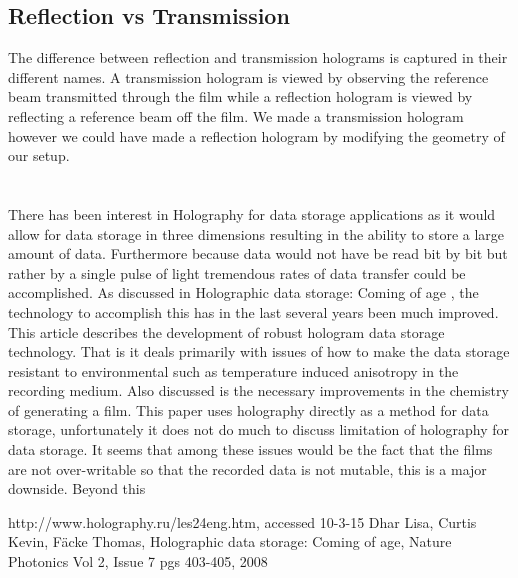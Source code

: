 \documentclass[11pt,letterpaper]{article}
\begin{document}
\subsection{Reflection vs Transmission}
The difference between reflection and transmission holograms is captured in their different names. A transmission hologram is viewed by observing the reference beam transmitted through the film while a reflection hologram is viewed by reflecting a reference beam off the film. We made a transmission hologram however we could have made a reflection hologram by modifying the geometry of our setup.
\section{} %
There has been interest in Holography for data storage applications as it would allow for data storage in three dimensions resulting in the ability to store a large amount of data. Furthermore because data would not have be read bit by bit but rather by a single pulse of light tremendous rates of data transfer could be accomplished. As discussed in Holographic data storage: Coming of age \cite{Data_Storage}, the technology to accomplish this has in the last several years been much improved. This article describes the development of robust hologram data storage technology. That is it deals primarily with issues of how to make the data storage resistant to environmental such as temperature induced anisotropy in the recording medium. Also discussed is the necessary improvements in the chemistry of generating a film. This paper uses holography directly as a method for data storage, unfortunately it does not do much to discuss limitation of holography for data storage. It seems that among these issues would be the fact that the films are not over-writable so that the recorded data is not mutable, this is a major downside. Beyond this 

\begin{thebibliography}{99}
 http://www.holography.ru/les24eng.htm, accessed 10-3-15
 Dhar Lisa, Curtis Kevin,  Fäcke Thomas, Holographic data storage: Coming of age, Nature Photonics Vol 2, Issue 7 pgs 403-405, 2008

\end{thebibliography}
\end{document}
